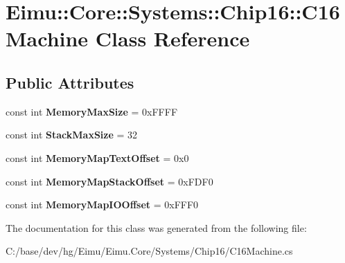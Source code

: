 \hypertarget{class_eimu_1_1_core_1_1_systems_1_1_chip16_1_1_c16_machine}{
\section{Eimu::Core::Systems::Chip16::C16Machine Class Reference}
\label{class_eimu_1_1_core_1_1_systems_1_1_chip16_1_1_c16_machine}
}
\subsection*{Public Attributes}
\begin{DoxyCompactItemize}
\item 
\hypertarget{class_eimu_1_1_core_1_1_systems_1_1_chip16_1_1_c16_machine_aba42a39ef65276d149f5a45f77404329}{
const int {\bfseries MemoryMaxSize} = 0xFFFF}
\label{class_eimu_1_1_core_1_1_systems_1_1_chip16_1_1_c16_machine_aba42a39ef65276d149f5a45f77404329}

\item 
\hypertarget{class_eimu_1_1_core_1_1_systems_1_1_chip16_1_1_c16_machine_a91a73743b59bc20708ed47b14d903ddb}{
const int {\bfseries StackMaxSize} = 32}
\label{class_eimu_1_1_core_1_1_systems_1_1_chip16_1_1_c16_machine_a91a73743b59bc20708ed47b14d903ddb}

\item 
\hypertarget{class_eimu_1_1_core_1_1_systems_1_1_chip16_1_1_c16_machine_a8a614400b5ff28d5e8604839c9e0e97e}{
const int {\bfseries MemoryMapTextOffset} = 0x0}
\label{class_eimu_1_1_core_1_1_systems_1_1_chip16_1_1_c16_machine_a8a614400b5ff28d5e8604839c9e0e97e}

\item 
\hypertarget{class_eimu_1_1_core_1_1_systems_1_1_chip16_1_1_c16_machine_aefa0d87c83606fe22d5fcc6f0ef53f5a}{
const int {\bfseries MemoryMapStackOffset} = 0xFDF0}
\label{class_eimu_1_1_core_1_1_systems_1_1_chip16_1_1_c16_machine_aefa0d87c83606fe22d5fcc6f0ef53f5a}

\item 
\hypertarget{class_eimu_1_1_core_1_1_systems_1_1_chip16_1_1_c16_machine_a2ec9037e916165316930d7edf63f0854}{
const int {\bfseries MemoryMapIOOffset} = 0xFFF0}
\label{class_eimu_1_1_core_1_1_systems_1_1_chip16_1_1_c16_machine_a2ec9037e916165316930d7edf63f0854}

\end{DoxyCompactItemize}


The documentation for this class was generated from the following file:\begin{DoxyCompactItemize}
\item 
C:/base/dev/hg/Eimu/Eimu.Core/Systems/Chip16/C16Machine.cs\end{DoxyCompactItemize}
